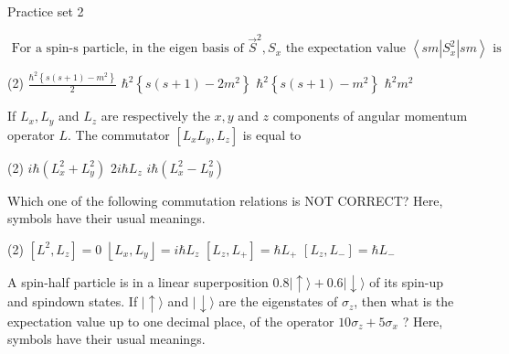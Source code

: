 \newpage 
\begin{abox}
Practice set 2 
\end{abox}
\begin{enumerate}
\begin{minipage}{\textwidth}
	\item $\text { For a spin-s particle, in the eigen basis of } \vec{S}^{2}, S_{x} \text { the expectation value }\left\langle s m\left|S_{x}^{2}\right| s m\right\rangle \text { is }$
\end{minipage}
\begin{tasks}(2)
	\task[\textbf{A.}] $\frac{\hbar^{2}\left\{s(s+1)-m^{2}\right\}}{2}$
	\task[\textbf{B.}] $\hbar^{2}\left\{s(s+1)-2 m^{2}\right\}$
	\task[\textbf{C.}]$\hbar^{2}\left\{s(s+1)-m^{2}\right\}$
	\task[\textbf{D.}]$\hbar^{2} m^{2}$
\end{tasks}
\begin{minipage}{\textwidth}
	\item If $L_{x}, L_{y}$ and $L_{z}$ are respectively the $x, y$ and $z$ components of angular momentum operator $L$. The commutator $\left[L_{x} L_{y}, L_{z}\right]$ is equal to
\end{minipage}
\begin{tasks}(2)
	\task[\textbf{A.}] $i \hbar\left(L_{x}^{2}+L_{y}^{2}\right)$
	\task[\textbf{B.}]$2 i \hbar L_{z}$
	\task[\textbf{C.}]$i \hbar\left(L_{x}^{2}-L_{y}^{2}\right)$
\end{tasks}
\begin{minipage}{\textwidth}
	\item Which one of the following commutation relations is NOT CORRECT? Here, symbols have their usual meanings.
\end{minipage}
\begin{tasks}(2)
	\task[\textbf{A.}] $\left[L^{2}, L_{z}\right]=0$
	\task[\textbf{B.}]$\left\lfloor L_{x}, L_{y}\right\rfloor=i \hbar L_{z}$
	\task[\textbf{C.}]$\left[L_{z}, L_{+}\right]=\hbar L_{+}$
	\task[\textbf{D.}]$\left[L_{z}, L_{-}\right]=\hbar L_{-}$
\end{tasks}
\begin{minipage}{\textwidth}
	\item A spin-half particle is in a linear superposition $0.8|\uparrow\rangle+0.6|\downarrow\rangle$ of its spin-up and spindown states. If $|\uparrow\rangle$ and $|\downarrow\rangle$ are the eigenstates of $\sigma_{z}$, then what is the expectation value up to one decimal place, of the operator $10 \sigma_{z}+5 \sigma_{x}$ ? Here, symbols have their usual meanings.

\end{minipage}
\end{enumerate}
